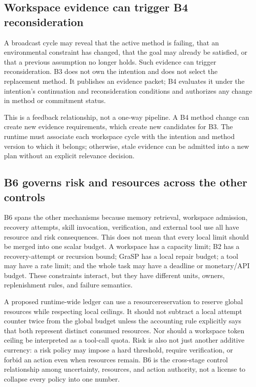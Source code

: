 \subsection{Workspace evidence can trigger B4 reconsideration}
\label{subsec:ch18-workspace-triggers-reconsideration}

A broadcast cycle may reveal that the active method is failing, that an environmental constraint has changed, that the goal may already be satisfied, or that a previous assumption no longer holds. Such evidence can trigger reconsideration. B3 does not own the intention and does not select the replacement method. It publishes an evidence packet; B4 evaluates it under the intention's continuation and reconsideration conditions and authorizes any change in method or commitment status.

This is a feedback relationship, not a one-way pipeline. A B4 method change can create new evidence requirements, which create new candidates for B3. The runtime must associate each workspace cycle with the intention and method version to which it belongs; otherwise, stale evidence can be admitted into a new plan without an explicit relevance decision.

\subsection{B6 governs risk and resources across the other controls}
\label{subsec:ch18-b6-crosscutting}

B6 spans the other mechanisms because memory retrieval, workspace admission, recovery attempts, skill invocation, verification, and external tool use all have resource and risk consequences. This does not mean that every local limit should be merged into one scalar budget. A workspace has a capacity limit; B2 has a recovery-attempt or recursion bound; GraSP has a local repair budget; a tool may have a rate limit; and the whole task may have a deadline or monetary/API budget. These constraints interact, but they have different units, owners, replenishment rules, and failure semantics.

A proposed runtime-wide ledger can use a \gls{resourcereservation} to reserve global resources while respecting local ceilings. It should not subtract a local attempt counter twice from the global budget unless the accounting rule explicitly says that both represent distinct consumed resources. Nor should a workspace token ceiling be interpreted as a tool-call quota. Risk is also not just another additive currency: a risk policy may impose a hard threshold, require verification, or forbid an action even when resources remain. B6 is the cross-stage control relationship among uncertainty, resources, and action authority, not a license to collapse every policy into one number.

